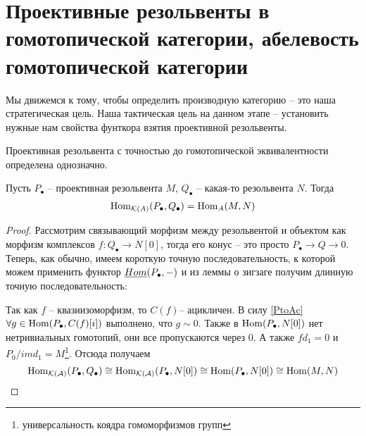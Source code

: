 \documentclass[../main.tex]{subfiles}
\begin{document}
\section{Проективные резольвенты в гомотопической категории, абелевость гомотопической категории}
Мы движемся к тому, чтобы определить производную категорию -- это наша стратегическая цель. Наша тактическая цель на данном этапе -- установить  нужные нам свойства фунткора взятия проективной резольвенты.
\begin{to_com}
Проективная резольвента с точностью до гомотопической эквивалентности определена однозначно.
\end{to_com}
\begin{to_suj}
Пусть $P_\bullet$ -- проективная резольвента $M$, $Q_\bullet$ -- какая-то резольвента $N$.
Тогда 
\begin{align*}
\operatorname{Hom}_{\mathcal{K}(A)}(P_\bullet, Q_\bullet) = \operatorname{Hom}_{A}(M, N)
\end{align*}
\end{to_suj}
\begin{proof}
Рассмотрим связывающий морфизм между резольвентой и объектом как морфизм комплексов $f\colon Q_\bullet \to N[0] $, тогда его конус -- это просто $P_\bullet\to Q \to 0$. Теперь, как обычно, имеем короткую точную последовательность, к которой можем применить функтор $\underline{Hom}(P_\bullet, - )$ и из леммы о зигзаге получим длинную точную последовательность:
\bee
{}
\eee
\bee
{}
\eee
Так как $f$ -- квазиизоморфизм, то $C(f)$-- ацикличен. В силу \ref{PtoAc} $\forall g \in \operatorname{Hom}(P_\bullet, C(f)[i])$ выполнено, что $g \sim 0$. Также в $\operatorname{Hom}(P_\bullet, N[0])$ нет нетривиальных гомотопий, они все пропускаются через 0. А также $f d_1 = 0$ и $P_0/im d_1 = M$\footnote{универсальность коядра гомоморфизмов групп}. Отсюда получаем
\[
\operatorname{Hom}_{\mathcal{K(A)}}(P_\bullet, Q_\bullet) \cong \operatorname{Hom}_{\mathcal{K(A)}}(P_\bullet, N[0]) \cong \operatorname{Hom}(P_\bullet, N[0]) \cong \operatorname{Hom}(M, N)
\]
\end{proof}
\end{document}
